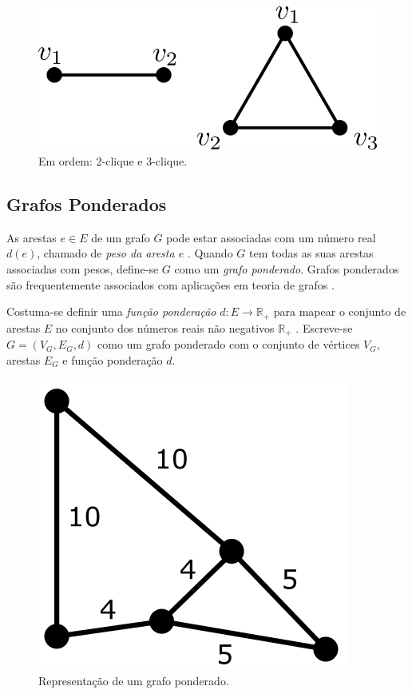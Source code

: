 \documentclass[a4paper,12pt]{article}
\begin{document}
\begin{figure}[H]
	\begin{center}
		\includegraphics[width=0.4\linewidth]{figures/cliques.png}
	\end{center}
	\caption{Em ordem: 2-clique e 3-clique.}
	\label{fig:cliques}
\end{figure}

\subsection{Grafos Ponderados}

As arestas $e\in E$ de um grafo $G$ pode estar associadas com um número real $d(e)$, chamado de \textit{peso da aresta $e$} \cite{graphTheoryApplicationsBondy}. Quando $G$ tem todas as suas arestas associadas com pesos, define-se $G$ como um \textit{grafo ponderado}. Grafos ponderados são frequentemente associados com aplicações em teoria de grafos \cite{grafosPremioElon}.

Costuma-se definir uma \textit{função ponderação} $d: E \longrightarrow \mathbb{R}_+$ para mapear o conjunto de arestas $E$ no conjunto dos números reais não negativos $\mathbb{R}_+$ \cite{libertiEDG}. Escreve-se $G = (V_G,E_G,d)$ como um grafo ponderado com o conjunto de vértices $V_G$, arestas $E_G$ e função ponderação $d$.

\begin{figure}[H]
	\begin{center}
		\includegraphics[width=0.26\linewidth]{figures/weightedGraph.png}
	\end{center}
	\caption{Representação de um grafo ponderado.}
	\label{fig:weightedGraph}
\end{figure}

{}



\end{document}
